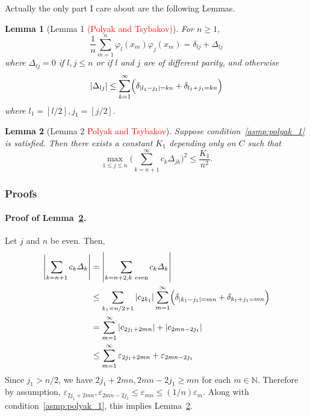 \documentclass{article}
\newcommand{\abs}[1]{\left \lvert #1 \right \rvert}
\newcommand{\1}{\mathbf{1}}
\theoremstyle{alden}
\theoremstyle{aldenthm}
\newtheorem{lemma}{Lemma}
\theoremstyle{definition}
\theoremstyle{remark}
\begin{document}
Actually the only part I care about are the following Lemmas.
\begin{lemma}[Lemma 1 \textcolor{red}{(Polyak and Tsybakov)}]
	For $n \geq 1$, 
	\begin{equation*}
	\frac{1}{n} \sum_{m = 1}^{n} \varphi_l(x_m) \varphi_j(x_m) = \delta_{lj} + \Delta_{lj}
	\end{equation*}
	where $\Delta_{lj} = 0$ if $l,j \leq n$ or if $l$ and $j$ are of different parity, and otherwise
	\begin{equation*}
	\abs{\Delta_{lj}} \leq \sum_{k = 1}^{\infty} \Bigl(\delta_{\abs{l_1 - j_1} = kn} + \delta_{l_1 + j_1 = kn}\Bigr)
	\end{equation*}
	where $l_1 = [l/2], j_1 = [j/2]$.
\end{lemma}

\begin{lemma}[Lemma 2 \textcolor{red}{Polyak and Tsybakov}]
	\label{lem:polyak90_2}
	Suppose condition~\eqref{asmp:polyak_1} is satisfied. Then there exists a constant $K_1$ depending only on $C$ such that
	\begin{equation*}
	\max_{1 \leq j \leq n} \biggl(\sum_{k = n + 1}^{\infty} c_k \Delta_{jk}\biggr)^2 \leq \frac{K_1}{n^2}.
	\end{equation*}
\end{lemma}
\subsubsection{Proofs}
\paragraph{Proof of Lemma~\ref{lem:polyak90_2}.}
Let $j$ and $n$ be even. Then,
\begin{align*}
\abs{\sum_{k = n + 1} c_k \varDelta_k} & = \abs{\sum_{k = n + 2, k~\textrm{even}} c_k \varDelta_k} \\
& \leq \sum_{k_1 = n/2 + 1} \abs{c_{2k_1}} \sum_{m = 1}^{\infty} \Bigl(\delta_{\abs{k_1 - j_1} = mn} + \delta_{k_1 + j_1 = mn}\Bigr) \\
& = \sum_{m = 1}^{\infty} \abs{c_{2j_1 + 2mn}} + \abs{c_{2mn - 2j_1}} \\
& \leq \sum_{m = 1}^{\infty} \varepsilon_{2j_1 + 2mn} + \varepsilon_{2mn - 2j_1}
\end{align*}
Since $j_1 > n/2$, we have $2j_1 + 2mn,2mn - 2j_1 \geq m n$ for each $m \in \mathbb{N}$. Therefore by assumption, $\varepsilon_{2j_1 + 2mn}, \varepsilon_{2mn - 2j_1} \leq \varepsilon_{mn} \leq (1/n) \varepsilon_{m}$. Along with condition~\eqref{asmp:polyak_1}, this implies Lemma~\ref{lem:polyak90_2}.
\end{document}
